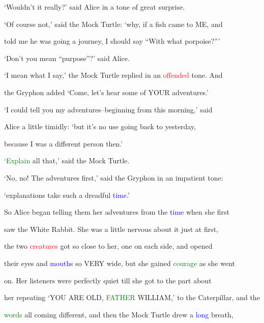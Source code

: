  ‘Wouldn’t it really?’ said Alice in a tone of great \textcolor{BurntOrange}{surprise.}



 ‘Of course not,’ said the Mock Turtle: ‘why, if a fish came to ME, and

 told me he was going a \textcolor{BurntOrange}{journey,} I should say “With what porpoise?”’



 ‘Don’t you mean “purpose”?’ said Alice.



 ‘I mean what I say,’ the Mock Turtle replied in an \textcolor{red}{offended} tone. And

 the Gryphon added ‘Come, let’s hear some of YOUR \textcolor{BurntOrange}{adventures.’}



 ‘I could tell you my adventures--beginning from this morning,’ said

 Alice a little timidly: ‘but it’s no use going back to yesterday,

 because I was a different person then.’



 \textcolor{green}{‘Explain} all that,’ said the Mock Turtle.



 ‘No, no! The \textcolor{BurntOrange}{adventures} first,’ said the Gryphon in an \textcolor{BurntOrange}{impatient} tone:

 ‘explanations take such a \textcolor{BurntOrange}{dreadful} \textcolor{blue}{time.’}



 So Alice began telling them her \textcolor{BurntOrange}{adventures} from the \textcolor{blue}{time} when she first

 saw the \textcolor{BurntOrange}{White} Rabbit. She was a little \textcolor{BurntOrange}{nervous} about it just at first,

 the two \textcolor{red}{creatures} got so close to her, one on each side, and opened

 their eyes and \textcolor{blue}{mouths} so VERY wide, but she \textcolor{BurntOrange}{gained} \textcolor{green}{courage} as she went

 on. Her listeners were perfectly \textcolor{BurntOrange}{quiet} till she got to the part about

 her repeating ‘YOU ARE OLD, \textcolor{green}{FATHER} WILLIAM,’ to the Caterpillar, and the

 \textcolor{green}{words} all coming different, and then the Mock Turtle drew a \textcolor{blue}{long} breath,

